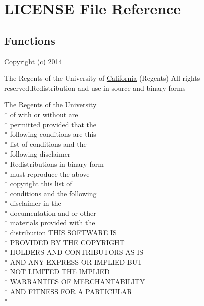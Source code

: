 \hypertarget{_l_i_c_e_n_s_e}{\section{L\+I\+C\+E\+N\+S\+E File Reference}
\label{_l_i_c_e_n_s_e}
}
\subsection*{Functions}
\begin{DoxyCompactItemize}
\item 
\hyperlink{_l_i_c_e_n_s_e_a26898e9dbaa4d7d26b750adb87ae1a49}{Copyright} (c) 2014
\item 
The Regents of the University of \hyperlink{_l_i_c_e_n_s_e_a23368790fe99626abcd18b5f03cfbeae}{California} (Regents) All rights reserved.\+Redistribution and use in source and binary forms
\item 
The Regents of the University \\*
of with or without are \\*
permitted provided that the \\*
following conditions are this \\*
list of conditions and the \\*
following disclaimer \\*
Redistributions in binary form \\*
must reproduce the above \\*
copyright this list of \\*
conditions and the following \\*
disclaimer in the \\*
documentation and or other \\*
materials provided with the \\*
distribution T\+H\+I\+S S\+O\+F\+T\+W\+A\+R\+E I\+S \\*
P\+R\+O\+V\+I\+D\+E\+D B\+Y T\+H\+E C\+O\+P\+Y\+R\+I\+G\+H\+T \\*
H\+O\+L\+D\+E\+R\+S A\+N\+D C\+O\+N\+T\+R\+I\+B\+U\+T\+O\+R\+S A\+S I\+S \\*
A\+N\+D A\+N\+Y E\+X\+P\+R\+E\+S\+S O\+R I\+M\+P\+L\+I\+E\+D B\+U\+T \\*
N\+O\+T L\+I\+M\+I\+T\+E\+D T\+H\+E I\+M\+P\+L\+I\+E\+D \\*
\hyperlink{_l_i_c_e_n_s_e_a3f8645b457d8bdef4fd7c3549fc01039}{W\+A\+R\+R\+A\+N\+T\+I\+E\+S} O\+F M\+E\+R\+C\+H\+A\+N\+T\+A\+B\+I\+L\+I\+T\+Y \\*
A\+N\+D F\+I\+T\+N\+E\+S\+S F\+O\+R A P\+A\+R\+T\+I\+C\+U\+L\+A\+R \\*

\end{DoxyCompactItemize}
